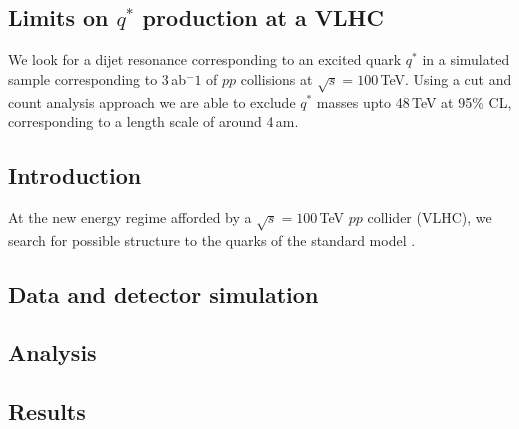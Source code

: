 \begin{boldmath}
\chapter{Limits on $q^*$ production at a VLHC}
\label{chap:VLHC_Qstar}
\end{boldmath}



We look for a dijet resonance corresponding to an excited quark $q^*$
in a simulated sample corresponding to 3\,ab$^-1$ of $pp$ collisions
at $\sqrt{s} = 100$\,TeV.  Using a cut and count analysis approach we
are able to exclude $q^*$ masses upto 48\,TeV at 95\% CL,
corresponding to a length scale of around 4\,am.

\section{Introduction}

At the new energy regime afforded by a $\sqrt{s} =100$\,TeV $pp$
collider (VLHC), we search for possible structure to the quarks of the
standard model \cite{Baur:1989kv}.

\section{Data and detector simulation}

\section{Analysis}

\section{Results}

